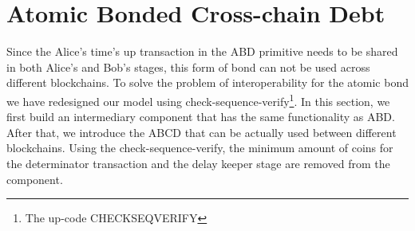 \section{Atomic Bonded Cross-chain Debt}
\label{sec:abcd}

Since the Alice's time's up transaction in the ABD primitive needs to be shared in both Alice's and Bob's stages, this form of bond can not be used across different blockchains. To solve the problem of interoperability for the atomic bond we have redesigned our model using check-sequence-verify\footnote{The up-code CHECKSEQVERIFY}. In this section, we first build an intermediary component that has the same functionality as ABD. After that, we introduce the ABCD that can be actually used between different blockchains.
Using the check-sequence-verify, the minimum amount of coins for the determinator transaction and the delay keeper stage are removed from the component.
